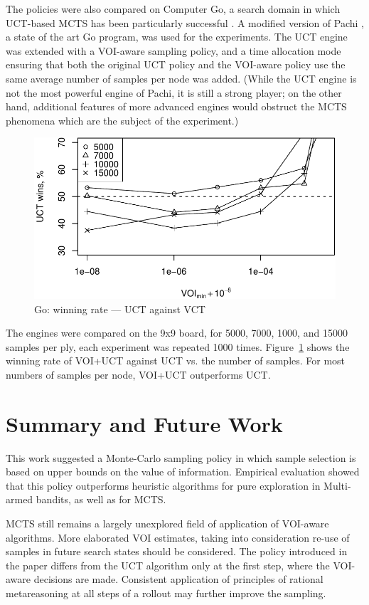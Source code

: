 \documentclass{ecai2012}
\begin{document}
The policies were also compared on Computer Go, a  search domain
in which UCT-based MCTS has been particularly successful
\cite{Gelly.mogo}. A modified version of Pachi \cite{Braudis.pachi}, a state of the art
Go program, was used for the experiments. The UCT engine was extended
with a VOI-aware sampling policy, and a time allocation mode ensuring
that both the original UCT policy and the VOI-aware policy use the
same average number of samples per node was added. (While the UCT
engine is not the most powerful engine of Pachi, it is still a strong
player; on the other hand, additional features of more advanced
engines would obstruct the MCTS phenomena which are the subject of
the experiment.)
\begin{figure}[h!]
\centering
\includegraphics[scale=0.5]{vct-wins.pdf}
\vspace{-8pt}
\caption{Go: winning rate --- UCT against VCT}
\label{fig:vct-against-uct}
\vspace{-16pt}
\end{figure}
The engines were compared on the 9x9 board, for 5000, 7000, 1000, and
15000 samples per ply, each experiment was repeated
1000 times. Figure~\ref{fig:vct-against-uct}
shows the winning rate of VOI+UCT against UCT vs. the number of
samples. For most numbers of samples per node, VOI+UCT outperforms UCT.

\section{Summary and Future Work}

This work suggested a Monte-Carlo sampling policy in which sample
selection is based on upper bounds on the value of
information. Empirical evaluation showed that this policy outperforms
heuristic algorithms for pure exploration in Multi-armed
bandits, as well as for MCTS.

MCTS still remains a largely unexplored field of
application of VOI-aware algorithms. More elaborated VOI estimates,
taking into consideration re-use of samples in future search states
should be considered. The policy introduced in the paper differs from
the UCT algorithm only at the first step, where the VOI-aware
decisions are made. Consistent application of principles of rational
metareasoning at all steps of a rollout may further improve the
sampling.



\end{document}
